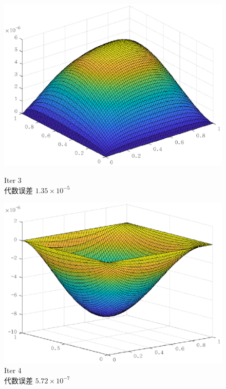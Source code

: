 \documentclass[lang=cn,10pt]{elegantbook}
\begin{document}
\begin{figure}[H]
\begin{minipage}[t]{0.22\linewidth}
    \includegraphics[width=0.84\linewidth]{figure/2-5-3.eps}
    \caption*{\small Iter 3 \\ 代数误差 $1.35\times 10^{-5}$}
  \end{minipage}
  \hspace{1em}
  \begin{minipage}[t]{0.22\linewidth}
    \centering
    \includegraphics[width=0.84\linewidth]{figure/2-5-4.eps}
    \caption*{\small Iter 4 \\ 代数误差 $5.72\times 10^{-7}$}
  \end{minipage}
\end{figure}
\end{document}
